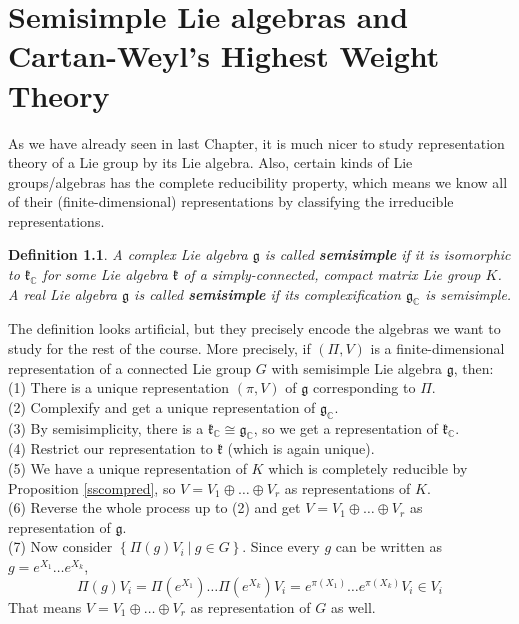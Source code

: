 \documentclass[11pt]{book}
\newtheorem{definition}[theorem]{Definition}
\newcommand{\bb}[1]{\mathbb{#1}}
\newcommand{\mf}[1]{\mathfrak{#1}}
\begin{document}
\chapter{Semisimple Lie algebras and Cartan-Weyl's Highest Weight Theory}
As we have already seen in last Chapter, it is much nicer to study representation theory of a Lie group by its Lie algebra. Also, certain kinds of Lie groups/algebras has the complete reducibility property, which means we know all of their (finite-dimensional) representations by classifying the irreducible representations.
\begin{definition}
A complex Lie algebra $\mf{g}$ is called \textbf{semisimple} if it is isomorphic to $\mf{k}_{\bb{C}}$ for some Lie algebra $\mf{k}$ of a simply-connected, compact matrix Lie group $K$.\\
A real Lie algebra $\mf{g}$ is called \textbf{semisimple} if its complexification $\mf{g}_{\bb{C}}$ is semisimple.
\end{definition}
The definition looks artificial, but they precisely encode the algebras we want to study for the rest of the course. More precisely, if $(\Pi,V)$ is a finite-dimensional representation of a connected Lie group $G$ with semisimple Lie algebra $\mf{g}$, then:\\

\noindent (1) There is a unique representation $(\pi,V)$ of $\mf{g}$ corresponding to $\Pi$.\\
(2) Complexify and get a unique representation of $\mf{g}_{\bb{C}}$.\\
(3) By semisimplicity, there is a $\mf{k}_{\bb{C}} \cong \mf{g}_{\bb{C}}$, so we get a representation of $\mf{k}_{\bb{C}}$.\\
(4) Restrict our representation to $\mf{k}$ (which is again unique).\\
(5) We have a unique representation of $K$ which is completely reducible by Proposition \ref{sscompred}, so $V = V_1 \oplus \dots \oplus V_r$ as representations of $K$.\\
(6) Reverse the whole process up to (2) and get $V = V_1 \oplus \dots \oplus V_r$ as representation of $\mf{g}$.\\
(7) Now consider $\left\{ \Pi(g)V_i\ \Big|\ g \in G\right\}$. Since every $g$ can be written as $g = e^{X_1} \dots e^{X_k}$,
$$\Pi(g)V_i = \Pi(e^{X_1}) \dots \Pi(e^{X_k})V_i = e^{\pi(X_1)}\dots e^{\pi(X_k)} V_i \in V_i$$
That means $V = V_1 \oplus \dots \oplus V_r$ as representation of $G$ as well.\\
\end{document}
